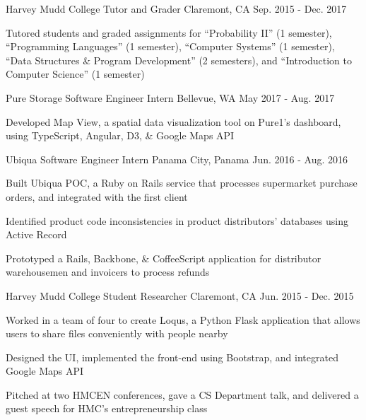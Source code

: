 \begin{cventries}
  \cventry
    {Harvey Mudd College} %
    {Tutor and Grader} %
    {Claremont, CA} %
    {Sep. 2015 - Dec. 2017} %
    {
      \begin{cvitems} %
        \item {Tutored students and graded assignments for
        ``Probability II'' (1 semester),
        ``Programming Languages'' (1 semester),
        ``Computer Systems'' (1 semester),
        ``Data Structures \& Program Development'' (2 semesters),
        and ``Introduction to Computer Science'' (1 semester)}
      \end{cvitems}
    }

  \cventry
    {Pure Storage} %
    {Software Engineer Intern} %
    {Bellevue, WA} %
    {May 2017 - Aug. 2017} %
    {
      \begin{cvitems} %
        \item {Developed Map View, a spatial data visualization tool on Pure1's
        dashboard, using TypeScript, Angular, D3, \& Google Maps API}
      \end{cvitems}
    }

  \cventry
    {Ubiqua} %
    {Software Engineer Intern} %
    {Panama City, Panama} %
    {Jun. 2016 - Aug. 2016} %
    {
      \begin{cvitems} %
        \item {Built Ubiqua POC, a Ruby on Rails service that processes
        supermarket purchase orders, and integrated with the first client}
        \item {Identified product code inconsistencies in product distributors’
        databases using Active Record}
        \item {Prototyped a Rails, Backbone, \& CoffeeScript application for
        distributor warehousemen and invoicers to process refunds}
      \end{cvitems}
    }

  \cventry
    {Harvey Mudd College} %
    {Student Researcher} %
    {Claremont, CA} %
    {Jun. 2015 - Dec. 2015} %
    {
      \begin{cvitems} %
        \item {Worked in a team of four to create Loqus, a Python Flask
        application that allows users to share files conveniently with people
        nearby}
        \item {Designed the UI, implemented the front-end using Bootstrap, and
        integrated Google Maps API}
        \item {Pitched at two HMCEN conferences, gave a CS Department
        talk, and delivered a guest speech for HMC's entrepreneurship class}
      \end{cvitems}
    }

\end{cventries}
